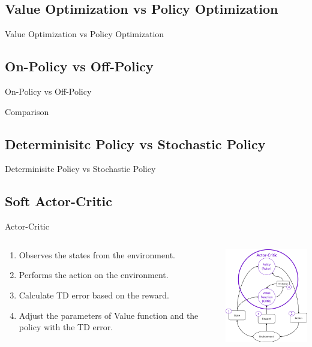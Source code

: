 \subsection{Value Optimization vs Policy Optimization}
\begin{frame}{Value Optimization vs Policy Optimization}
\end{frame}

\subsection{On-Policy vs Off-Policy}
\begin{frame}{On-Policy vs Off-Policy}
\end{frame}

\begin{frame}{Comparison}
\end{frame}

\subsection{Determinisitc Policy vs Stochastic Policy}
\begin{frame}{Determinisitc Policy vs Stochastic Policy}
\end{frame}

\subsection{Soft Actor-Critic}
\begin{frame}{Actor-Critic}
 \begin{columns}
    \begin{column}{0.45\textwidth}
    \begin{enumerate}
        \item Observes the states from the environment.
        \item Performs the action on the environment.
        \item Calculate TD error based on the reward.
        \item Adjust the parameters of Value function and the policy with the TD error.
    \end{enumerate}
    \end{column}
    \begin{column}{0.45\textwidth}
    \centering
    \includegraphics[width=5cm]{images/actor_critic.png}
 \end{column}
 \end{columns}
\end{frame}

